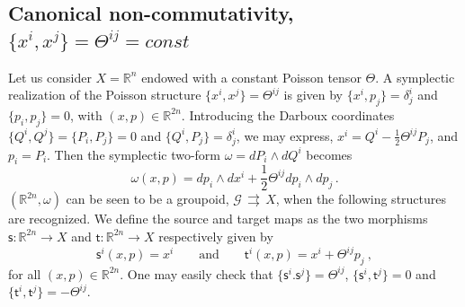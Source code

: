 \documentclass[12pt,a4paper]{article}
\numberwithin{equation}{section}
\theoremstyle{definition}
\newcommand{\cG}{\mathcal{G}}
\newcommand{\sfs}{\mathsf{s}}
\newcommand{\sft}{\mathsf{t}}
\newcommand{\R}{\mathbb{R}}
\begin{document}
\subsection{Canonical non-commutativity, \texorpdfstring{$\{x^i,x^j\}=\Theta^{ij}=const$} {}}\label{sec_1-1}
{Let us consider $X= \R^n$ endowed with a constant Poisson tensor $\Theta$. 
A symplectic realization of the Poisson structure $\{x^i,x^j\}=\Theta^{ij}$ is given by $\{x^i,p_j\}=\delta^i_j$ and $\{p_i,p_j\}=0$, with $(x,p)\in \R^{2n}$.}  Introducing the Darboux coordinates $\{Q^i,Q^j\}=\{P_i,P_j\}=0$ and $\{Q^i,P_j\}=\delta^i_j$, we may express, $x^i=Q^i-\frac12\Theta^{ij}P_j$, and $p_i=P_i$. Then the symplectic two-form $\omega=dP_i \wedge dQ^i$ becomes
\begin{equation}\label{omegac}
\omega(x,p)=dp_i\wedge dx^i+\frac12 \Theta^{ij}dp_i\wedge dp_j\,.
\end{equation}
{$(\R^{2n}, \omega)$ can be seen to be a groupoid, $\cG\,\rightrightarrows\,X$, when the following structures are recognized. We define the source and target maps as the two morphisms  $\sfs:\mathbb{R} ^{2n}\to X$ and $\sft:\mathbb{R} ^{2n}\to X$ respectively given by}
\begin{equation}\label{stmc}
            \sfs^i(x,p)= x^i \qquad \text{and} \qquad \sft^i(x,p)=x^i+\Theta^{ij}p_j \ ,
        \end{equation}
for all $(x,p)\in \mathbb{R} ^{2n}$. One may easily check that $\{ \sfs^i. \sfs^j\}=\Theta^{ij}$, $\{ \sfs^i, \sft^j\}=0$ and $\{\sft^i,\sft^j\}=-\Theta^{ij}$. 
\end{document}
